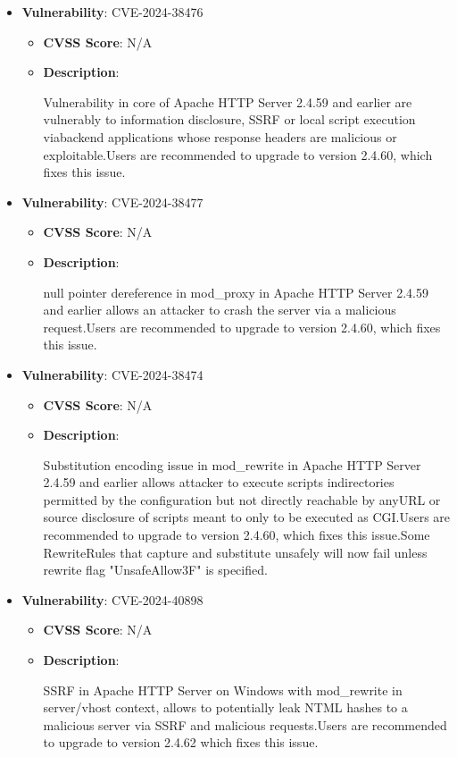 \documentclass{article}
\begin{document}
\begin{itemize}
        \item \textbf{Vulnerability}: CVE-2024-38476
        \begin{itemize}
            \item \textbf{CVSS Score}:  N/A 
            \item \textbf{Description}:
            \parbox[t]{0.9\linewidth}{
                \ttfamily Vulnerability in core of Apache HTTP Server 2.4.59 and earlier are vulnerably to information disclosure, SSRF or local script execution viabackend applications whose response headers are malicious or exploitable.Users are recommended to upgrade to version 2.4.60, which fixes this issue.
            }
        \end{itemize}
    
        \item \textbf{Vulnerability}: CVE-2024-38477
        \begin{itemize}
            \item \textbf{CVSS Score}:  N/A 
            \item \textbf{Description}:
            \parbox[t]{0.9\linewidth}{
                \ttfamily null pointer dereference in mod\_proxy in Apache HTTP Server 2.4.59 and earlier allows an attacker to crash the server via a malicious request.Users are recommended to upgrade to version 2.4.60, which fixes this issue.
            }
        \end{itemize}
    
        \item \textbf{Vulnerability}: CVE-2024-38474
        \begin{itemize}
            \item \textbf{CVSS Score}:  N/A 
            \item \textbf{Description}:
            \parbox[t]{0.9\linewidth}{
                \ttfamily Substitution encoding issue in mod\_rewrite in Apache HTTP Server 2.4.59 and earlier allows attacker to execute scripts indirectories permitted by the configuration but not directly reachable by anyURL or source disclosure of scripts meant to only to be executed as CGI.Users are recommended to upgrade to version 2.4.60, which fixes this issue.Some RewriteRules that capture and substitute unsafely will now fail unless rewrite flag "UnsafeAllow3F" is specified.
            }
        \end{itemize}
    
        \item \textbf{Vulnerability}: CVE-2024-40898
        \begin{itemize}
            \item \textbf{CVSS Score}:  N/A 
            \item \textbf{Description}:
            \parbox[t]{0.9\linewidth}{
                \ttfamily SSRF in Apache HTTP Server on Windows with mod\_rewrite in server/vhost context, allows to potentially leak NTML hashes to a malicious server via SSRF and malicious requests.Users are recommended to upgrade to version 2.4.62 which fixes this issue.
            }
        \end{itemize}
    

\end{itemize}
\end{document}
